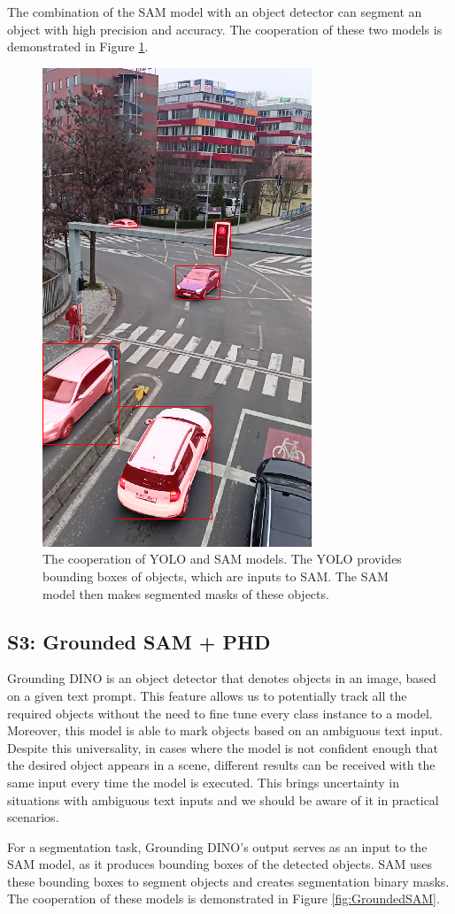 The combination of the SAM model with an object detector can segment an object with high precision and accuracy.
The cooperation of these two models is demonstrated in Figure \ref{fig:yolo_sam_seg}.
\begin{figure}[h!t]
  \centering
  \includegraphics[width=0.35\linewidth]{text/chapter_04/imgs/YOLO_SAM_02}
  \caption{The cooperation of YOLO and SAM models. The YOLO provides bounding boxes of objects, which are inputs to
  SAM. The SAM model then makes segmented masks of these objects.}
  \label{fig:yolo_sam_seg}
\end{figure}

\subsection{S3: Grounded SAM + PHD}
Grounding DINO is an object detector that denotes objects in an image, based on a given text prompt. This feature
allows us to potentially track all the required objects without the need to fine tune every class instance to a model.
Moreover, this
model is able to mark objects based on an ambiguous text input. Despite this universality,
in cases where the
model is not confident enough that the desired object appears in a scene, different results can be received with
the same input every time the model is executed. This brings uncertainty in situations with ambiguous text inputs
and we should be aware of it in practical scenarios.

For a segmentation task, Grounding DINO's output serves as an input to the SAM model, as it produces bounding boxes
of the
detected objects.
SAM uses these bounding boxes to segment objects and creates segmentation binary masks. The cooperation of these models is demonstrated in Figure \ref{fig:GroundedSAM}.

